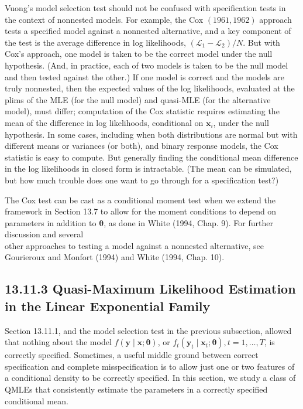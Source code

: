 \documentclass[10pt]{article}
\begin{document}
Vuong's model selection test should not be confused with specification tests in the context of nonnested models. For example, the Cox $(1961,1962)$ approach tests a specified model against a nonnested alternative, and a key component of the test is the average difference in log likelihoods, $\left(\mathscr{L}_{1}-\mathscr{L}_{2}\right) / N$. But with Cox's approach, one model is taken to be the correct model under the null hypothesis. (And, in practice, each of two models is taken to be the null model and then tested against the other.) If one model is correct and the models are truly nonnested, then the expected values of the log likelihoods, evaluated at the plims of the MLE (for the null model) and quasi-MLE (for the alternative model), must differ; computation of the Cox statistic requires estimating the mean of the difference in log likelihoods, conditional on $\mathbf{x}_{i}$, under the null hypothesis. In some cases, including when both distributions are normal but with different means or variances (or both), and binary response models, the Cox statistic is easy to compute. But generally finding the conditional mean difference in the log likelihoods in closed form is intractable. (The mean can be simulated, but how much trouble does one want to go through for a specification test?)

The Cox test can be cast as a conditional moment test when we extend the framework in Section 13.7 to allow for the moment conditions to depend on parameters in addition to $\boldsymbol{\theta}$, as done in White (1994, Chap. 9). For further discussion and several\\
other approaches to testing a model against a nonnested alternative, see Gourieroux and Monfort (1994) and White (1994, Chap. 10).

\subsection*{13.11.3 Quasi-Maximum Likelihood Estimation in the Linear Exponential Family}
Section 13.11.1, and the model selection test in the previous subsection, allowed that nothing about the model $f(\mathbf{y} \mid \mathbf{x} ; \boldsymbol{\theta})$, or $f_{t}\left(\mathbf{y}_{t} \mid \mathbf{x}_{t} ; \boldsymbol{\theta}\right), t=1, \ldots, T$, is correctly specified. Sometimes, a useful middle ground between correct specification and complete misspecification is to allow just one or two features of a conditional density to be correctly specified. In this section, we study a class of QMLEs that consistently estimate the parameters in a correctly specified conditional mean.
\end{document}
